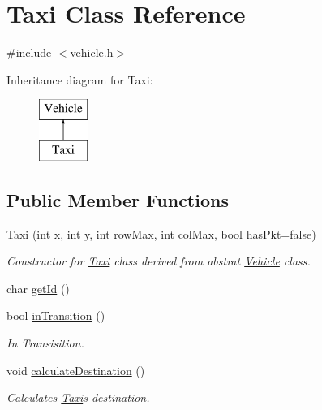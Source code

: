\hypertarget{class_taxi}{}\section{Taxi Class Reference}
\label{class_taxi}


{\ttfamily \#include $<$vehicle.\+h$>$}

Inheritance diagram for Taxi\+:\begin{figure}[H]
\begin{center}
\leavevmode
\includegraphics[height=2.000000cm]{d1/d8b/class_taxi}
\end{center}
\end{figure}
\subsection*{Public Member Functions}
\begin{DoxyCompactItemize}
\item 
\hyperlink{class_taxi_a94354d19d68c6cb60805debd9ac28880}{Taxi} (int x, int y, int \hyperlink{class_vehicle_a9c3dce0e6d67ba8f703cfd0ff10cb6ac}{row\+Max}, int \hyperlink{class_vehicle_a8364facc67825674d98b0fd8daf2ebee}{col\+Max}, bool \hyperlink{class_vehicle_a1d5bd3f458b1c11f0034320e8be4ae32}{has\+Pkt}=false)
\begin{DoxyCompactList}\small\item\em Constructor for \hyperlink{class_taxi}{Taxi} class derived from abstrat \hyperlink{class_vehicle}{Vehicle} class. \end{DoxyCompactList}\item 
char \hyperlink{class_taxi_a627cf1c475dd2bfafca59fceae551d09}{get\+Id} ()
\item 
bool \hyperlink{class_taxi_aa4439261ca296dcb30339078bb344931}{in\+Transition} ()
\begin{DoxyCompactList}\small\item\em In Transisition. \end{DoxyCompactList}\item 
void \hyperlink{class_taxi_aa746995561a978caeaa496b7350056be}{calculate\+Destination} ()
\begin{DoxyCompactList}\small\item\em Calculates \hyperlink{class_taxi}{Taxi}\textquotesingle{}s destination. \end{DoxyCompactList}\end{DoxyCompactItemize}
